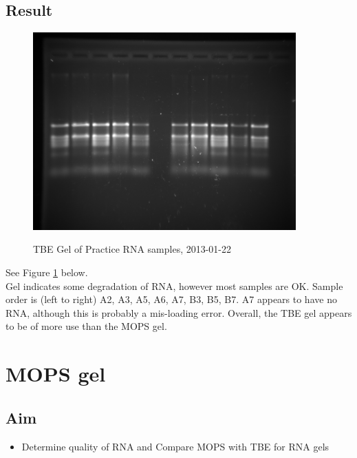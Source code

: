 \documentclass[12pt,a4paper]{book}
\begin{document}
    \subsection*{Result}
      \begin{figure}[h!]
        \caption{TBE Gel of Practice RNA samples, 2013-01-22}
        \centering
          \includegraphics[width=0.9\textwidth]{./2013-01/20130122-PracticeRNATBE}
        \label{fig:20130122-PracticeRNATBE}
      \end{figure}
      See Figure \ref{fig:20130122-PracticeRNATBE} below.\\
      Gel indicates some degradation of RNA, however most samples are OK. Sample order is (left to right) A2, A3, A5,
      A6, A7, B3, B5, B7. A7 appears to have no RNA, although this is probably a mis-loading error. Overall, the TBE gel
      appears to be of more use than the MOPS gel.\\

  \section*{MOPS gel}
    \subsection*{Aim}
      \begin{itemize} \itemsep1pt \parskip0pt 
        \item Determine quality of RNA and Compare MOPS with TBE for RNA gels
      \end{itemize}
\end{document}
